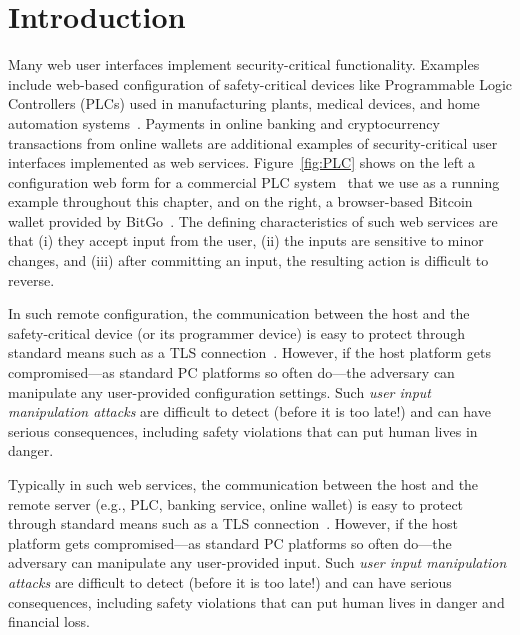 \section{Introduction}
\label{sec:introduction}

Many web user interfaces implement security-critical functionality. Examples include web-based configuration of safety-critical devices like Programmable Logic Controllers (PLCs) used in manufacturing plants, medical devices, and home automation systems~\cite{7306669,siemens,siemens2,schneider}. Payments in online banking and cryptocurrency transactions from online wallets are additional examples of security-critical user interfaces implemented as web services. Figure~\ref{fig:PLC} shows on the left a configuration web form for a commercial PLC system~\cite{controlbyweb} that we use as a running example throughout this chapter, and on the right, a browser-based Bitcoin wallet provided by BitGo~\cite{bitgo}. The defining characteristics of such web services are that (i) they accept input from the user, (ii) the inputs are sensitive to minor changes, and (iii) after committing an input, the resulting action is difficult to reverse.

In such remote configuration, the communication between the host and the safety-critical device (or its programmer device) is easy to protect through standard means such as a TLS connection~\cite{dierks2008transport}. However, if the host platform gets compromised---as standard PC platforms so often do---the adversary can manipulate any user-provided configuration settings. Such \emph{user input manipulation attacks} are difficult to detect (before it is too late!) and can have serious consequences, including safety violations that can put human lives in danger.

Typically in such web services, the communication between the host and the remote server (e.g., PLC, banking service, online wallet) is easy to protect through standard means such as a TLS connection~\cite{dierks2008transport}. However, if the host platform gets compromised---as standard PC platforms so often do---the adversary can manipulate any user-provided input. Such \emph{user input manipulation attacks} are difficult to detect (before it is too late!) and can have serious consequences, including safety violations that can put human lives in danger and financial loss. 


